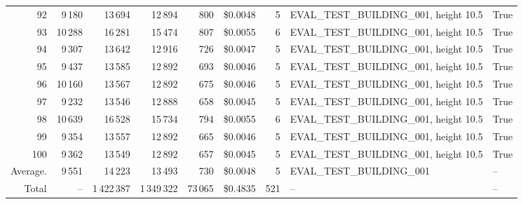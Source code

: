 \documentclass[a4paper,11pt]{article}
\begin{document}
\begin{table}[ht]
\begin{tabular}{r r r r r r r p{3cm} l}
92 & 9\,180 & 13\,694 & 12\,894 & 800 & \$0.0048 & 5 & EVAL\_TEST\_BUILDING\_001, height 10.5 & True \\
93 & 10\,288 & 16\,281 & 15\,474 & 807 & \$0.0055 & 6 & EVAL\_TEST\_BUILDING\_001, height 10.5 & True \\
94 & 9\,307 & 13\,642 & 12\,916 & 726 & \$0.0047 & 5 & EVAL\_TEST\_BUILDING\_001, height 10.5 & True \\
95 & 9\,437 & 13\,585 & 12\,892 & 693 & \$0.0046 & 5 & EVAL\_TEST\_BUILDING\_001, height 10.5 & True \\
96 & 10\,160 & 13\,567 & 12\,892 & 675 & \$0.0046 & 5 & EVAL\_TEST\_BUILDING\_001, height 10.5 & True \\
97 & 9\,232 & 13\,546 & 12\,888 & 658 & \$0.0045 & 5 & EVAL\_TEST\_BUILDING\_001, height 10.5 & True \\
98 & 10\,639 & 16\,528 & 15\,734 & 794 & \$0.0055 & 6 & EVAL\_TEST\_BUILDING\_001, height 10.5 & True \\
99 & 9\,354 & 13\,557 & 12\,892 & 665 & \$0.0046 & 5 & EVAL\_TEST\_BUILDING\_001, height 10.5 & True \\
100 & 9\,362 & 13\,549 & 12\,892 & 657 & \$0.0045 & 5 & EVAL\_TEST\_BUILDING\_001, height 10.5 & True \\
\hline
Average. & 9\,551 & 14\,223 & 13\,493 & 730 & \$0.0048 & 5 & EVAL\_TEST\_BUILDING\_001 & -- \\
Total & -- & 1\,422\,387 & 1\,349\,322 & 73\,065 & \$0.4835 & 521 & -- & -- \\
\hline
\end{tabular}
\end{table}

\clearpage
\end{document}
